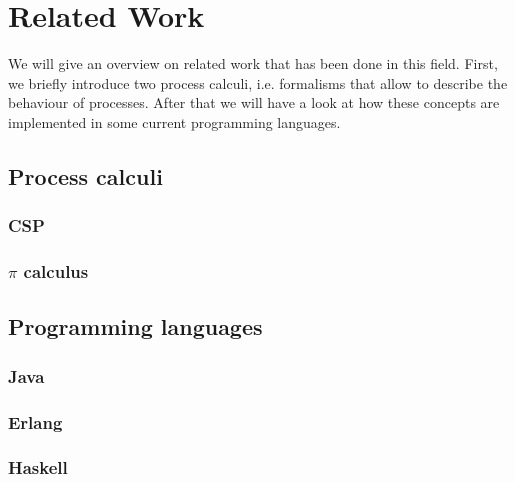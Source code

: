 \chapter{Related Work}
We will give an overview on related work that has been done in this field. First, we briefly introduce two process calculi, i.e. formalisms that allow to describe the behaviour of processes. After that we will have a look at how these concepts are implemented in some current programming languages.

\section{Process calculi}

\subsection{CSP}

\subsection{$\pi$ calculus}

\section{Programming languages}

\subsection{Java}

\subsection{Erlang}

\subsection{Haskell}